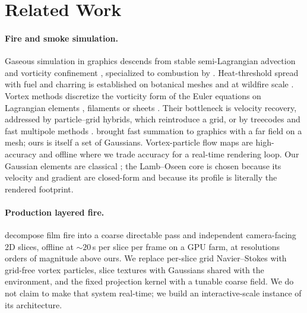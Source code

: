 \documentclass[acmtog,nonacm]{acmart}
\begin{document}
\section{Related Work}
\paragraph{Fire and smoke simulation.} Gaseous simulation in graphics descends from stable semi-Lagrangian advection \cite{stam1999} and vorticity confinement \cite{fedkiw2001,steinhoff1994}, specialized to combustion by \citet{nguyen2002}. Heat-threshold spread with fuel and charring is established on botanical meshes \cite{pirk2017} and at wildfire scale \cite{hadrich2021}. Vortex methods discretize the vorticity form of the Euler equations on Lagrangian elements \cite{chorin1973,cottet2000,park2005,selle2005}, filaments \cite{angelidis2005,weimann2010} or sheets \cite{brochu2012,pfaff2012}. Their bottleneck is velocity recovery, addressed by particle--grid hybrids, which reintroduce a grid, or by treecodes and fast multipole methods \cite{barnes1986,greengard1987,lindsay2001}. \citet{zhang2014} brought fast summation to graphics with a far field on a mesh; ours is itself a set of Gaussians. Vortex-particle flow maps \cite{wang2025} are high-accuracy and offline where we trade accuracy for a real-time rendering loop. Our Gaussian elements are classical \cite{beale1985,leonard1980}; the Lamb--Oseen core is chosen because its velocity and gradient are closed-form and because its profile is literally the rendered footprint.

\paragraph{Production layered fire.} \citet{horvath2009} decompose film fire into a coarse directable pass and independent camera-facing 2D slices, offline at $\sim\!20$\,s per slice per frame on a GPU farm, at resolutions orders of magnitude above ours. We replace per-slice grid Navier--Stokes with grid-free vortex particles, slice textures with Gaussians shared with the environment, and the fixed projection kernel with a tunable coarse field. We do not claim to make that system real-time; we build an interactive-scale instance of its architecture.
\end{document}
